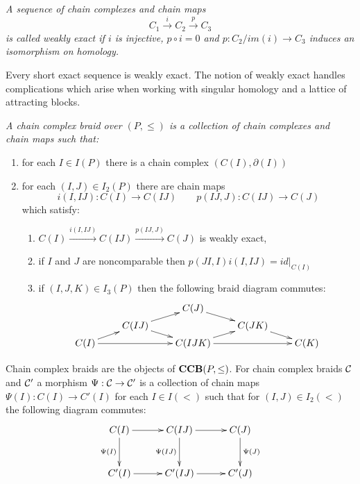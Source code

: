 \begin{defn}
{\em
A sequence of chain complexes and chain maps $$C_1\xrightarrow{i} C_2 \xrightarrow{p} C_3$$
is called {\em weakly exact} if $i$ is injective, $p\circ i = 0$ and $p:C_2/im(i)\to C_3$ induces an isomorphism on homology.
}
\end{defn}
\begin{rem}
Every short exact sequence is weakly exact. The notion of weakly exact handles complications which arise when working with singular homology and a lattice of attracting blocks.
\end{rem}

\begin{defn}
{\em
A {\em chain complex braid} over $(P,\leq)$ is a collection of chain complexes and chain maps such that:
\begin{enumerate}
\item for each $I\in I(P)$ there is a chain complex $(C(I),\partial(I))$
\item for each $(I,J)\in I_2(P)$ there are chain maps $$i(I,IJ):C(I)\to C(IJ)\quad\quad p(IJ,J):C(IJ)\to C(J)$$ which satisfy:
\begin{enumerate}
\item $C(I)\xrightarrow{i(I,IJ)} C(IJ)\xrightarrow{p(IJ,J)} C(J)$ is weakly exact,
\item if $I$ and $J$ are noncomparable then $p(JI,I)i(I,IJ)=id|_{C(I)}$
\item if $(I,J,K)\in I_3(P)$ then the following braid diagram commutes:
\[
\xymatrixrowsep{0.03in}
\xymatrixcolsep{0.3in}
\xymatrix{
& & C(J) \ar[dr] & &  \\
& C(IJ) \ar[ur] \ar[dr] & & C(JK) \ar[dr] &  \\
C(I) \ar[ur] \ar[rr]& & C(IJK) \ar[rr] \ar[ur]& & C(K) 
}
\]
\end{enumerate}

\end{enumerate}
}
\end{defn}

Chain complex braids are the objects of ${\bf CCB}(P,\leq)$.  For  chain complex braids ${\mathcal C}$ and ${\mathcal C}'$ a morphism $\Psi:{\mathcal C}\to {\mathcal C}'$  is a collection of chain maps $\Psi(I):C(I)\to C'(I)$ for each $I\in I(<)$ such that for $(I,J)\in I_2(<)$ the following diagram commutes:
\[
\xymatrixcolsep{0.4in}
\xymatrixrowsep{0.4in}
\xymatrix{
C(I) \ar[r] \ar@{->}[d]_{\Psi(I)} & C(IJ) \ar@{->}[d]_{\Psi(IJ)} \ar[r] & C(J) \ar@{->}[d]^{\Psi(J)}  \\
C'(I) \ar[r] & C'(IJ) \ar[r] & C'(J)
}
\] 

